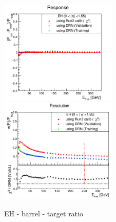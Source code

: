 \begin{figure}
\includegraphics[width=0.495\textwidth]{./plots_pdf/HCAL_plots/Trained_target_ratioflip_0_500_10/pdf/EH_barrel/barrel_corrEtaBarrelEcalHcal.png}
\includegraphics[width=0.495\textwidth]{./plots_pdf/HCAL_plots/Trained_target_ratioflip_0_500_10/pdf/EH_barrel/barrel_corrEtaBarrelEcalHcal_reso.png}
\caption{EH - barrel - target ratio}                                                                                                                                               
\end{figure}                                                                                                                                                                      


